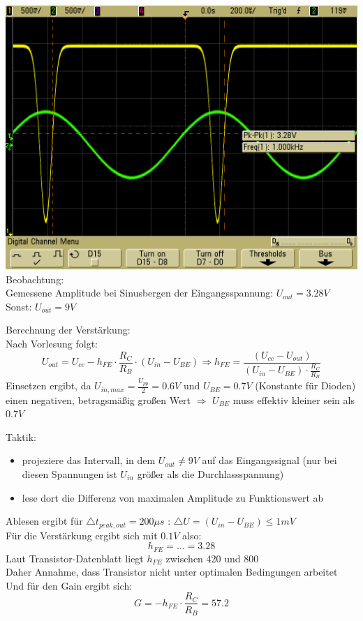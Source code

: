 \documentclass[compress,11pt]{beamer}
\begin{document}
\begin{frame}

\includegraphics[width=.7\textwidth]{../daten/oszi/scope_45}\\
Beobachtung:\\
Gemessene Amplitude bei Sinusbergen der Eingangsspannung: $U_{out} = 3.28 V$\\
Sonst: $U_{out} = 9 V$
\end{frame}
\begin{frame}
Berechnung der Verstärkung:\\
Nach Vorlesung folgt:
\begin{equation}
U_{out} = U_{cc} - h_{FE} \cdot \frac{R_C}{R_B} \cdot (U_{in} - U_{BE}) \Rightarrow h_{FE} = \frac{(U_{cc} - U_{out})}{(U_{in} - U_{BE}) \cdot \frac{R_C}{R_B}}
\end{equation}
Einsetzen ergibt, da $U_{in,max} = \frac{U_{pp}}{2} = 0.6 V$ und $U_{BE} = 0.7 V$ (Konstante für Dioden) einen negativen, betragsmäßig großen Wert $\Rightarrow$ $U_{BE}$ muss effektiv kleiner sein als $0.7 V$\\
\end{frame}
\begin{frame}

Taktik:
\begin{itemize}
\item projeziere das Intervall, in dem $U_{out} \neq 9 V$ auf das Eingangssignal (nur bei diesen Spannungen ist $U_{in}$ größer als die Durchlassspannung)
\item lese dort die Differenz von maximalen Amplitude zu Funktionswert ab
\end{itemize}


\end{frame}
\begin{frame}
Ablesen ergibt für $\bigtriangleup t_{peak,out} = 200 \mu s$ : $\bigtriangleup U = (U_{in} - U_{BE}) \leq 1 mV$ \\ Für die Verstärkung ergibt sich mit $0.1 V$ also:
\begin{equation}
h_{FE} = \dots 	= 3.28
\end{equation}
Laut Transistor-Datenblatt liegt $h_{FE}$ zwischen 420 und 800\\
Daher Annahme, dass Transistor nicht unter optimalen Bedingungen arbeitet\\
Und für den Gain ergibt sich:
\begin{equation}
G = -h_{FE} \cdot \frac{R_C}{R_B} = 57.2
\end{equation}
\end{frame}
\end{document}
